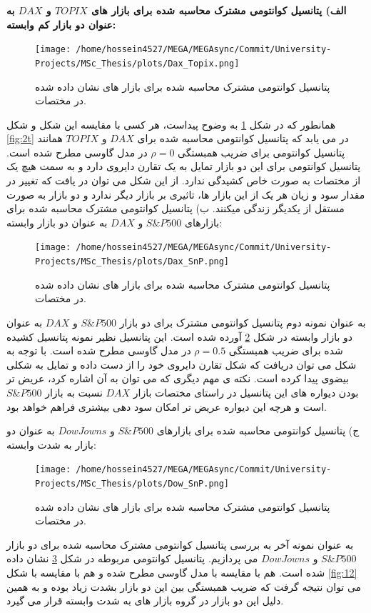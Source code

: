 \documentclass[a4paper,titlepage,12pt,fleqn,oneside]{report}
\begin{document}
\textbf{
الف) پتانسیل کوانتومی مشترک محاسبه شده برای بازار های 
$TOPIX$
و 
$DAX$
به عنوان دو بازار کم وابسته:
}


 \begin{figure}[ptb]
	\centering
	\texttt{[image: /home/hossein4527/MEGA/MEGAsync/Commit/University-Projects/MSc\_Thesis/plots/Dax\_Topix.png]}
	\caption{پتانسیل کوانتومی مشترک محاسبه شده برای بازار های نشان داده شده در مختصات.}
	\label{fig:13}
\end{figure}
همانطور که در شکل
\ref{fig:13}
به وضوح پیداست، هر کسی با مقایسه این شکل و شکل 
\ref{fig:2t}
در می یابد که پتانسیل کوانتومی محاسبه شده برای 
$DAX$
و
$TOPIX$
همانند پتانسیل کوانتومی برای ضریب همبستگی 
$\rho=0$
در مدل گاوسی مطرح شده است. پتانسیل کوانتومی برای این دو بازار تمایل به یک تقارن دایروی دارد و به سمت هیچ یک از مختصات به صورت خاص کشیدگی ندارد. از این شکل می توان در یافت که تغییر در مقدار سود و زیان هر یک از این بازار ها، تاثیری بر بازار دیگر ندارد و دو بازار به صورت مستقل از یکدیگر زندگی میکنند.
\newline
\newline
ب) پتانسیل کوانتومی مشترک محاسبه شده برای بازارهای 
$S\&P500$
و
$DAX$
به عنوان دو بازار وابسته:
 \begin{figure}[ptb]
	\centering
	\texttt{[image: /home/hossein4527/MEGA/MEGAsync/Commit/University-Projects/MSc\_Thesis/plots/Dax\_SnP.png]}
	\caption{پتانسیل کوانتومی مشترک محاسبه شده برای بازار های نشان داده شده در مختصات.}
	\label{fig:14}
\end{figure}
به عنوان نمونه دوم پتانسیل کوانتومی مشترک برای دو بازار 
$S\&P500$
و
$DAX$
به عنوان دو بازار وابسته در شکل
\ref{fig:14}
آورده شده است.
این پتانسیل نظیر نمونه پتانسیل کشیده شده برای ضریب همبستگی
$\rho=0.5$
در مدل گاوسی مطرح شده است.
با توجه به شکل می توان دریافت که شکل تقارن دایروی خود را از دست داده و تمایل به شکلی بیضوی پیدا کرده است. 
نکته ی مهم دیگری که می توان به آن اشاره کرد، عریض تر بودن دیواره های این پتانسیل در راستای مختصات بازار 
$DAX$
نسبت به بازار 
$S\&P500$
است و هرچه این دیواره عریض تر امکان سود دهی بیشتری فراهم خواهد بود. 

ج) پتانسیل کوانتومی محاسبه شده برای بازارهای 
$S\&P500$
و
$Dow Jowns$
به عنوان دو بازار به شدت وابسته:

 \begin{figure}[ptb]
	\centering
	\texttt{[image: /home/hossein4527/MEGA/MEGAsync/Commit/University-Projects/MSc\_Thesis/plots/Dow\_SnP.png]}
	\caption{پتانسیل کوانتومی مشترک محاسبه شده برای بازار های نشان داده شده در مختصات.}
	\label{fig:15}
\end{figure}
به عنوان نمونه آخر به بررسی پتانسیل کوانتومی مشترک محاسبه شده برای دو بازار 
$S\&P500$
و
$Dow Jowns$
می پردازیم. پتانسیل کوانتومی مربوطه در شکل
\ref{fig:15}
نشان داده شده است. هم با مقایسه با مدل گاوسی مطرح شده و هم با مقایسه با شکل
\ref{fig:12}
می توان نتیجه گرفت که ضریب همبستگی بین این دو بازار بشدت زیاد بوده و به همین دلیل این دو بازار در گروه بازار های به شدت وابسته قرار می گیرد.
\end{document}
